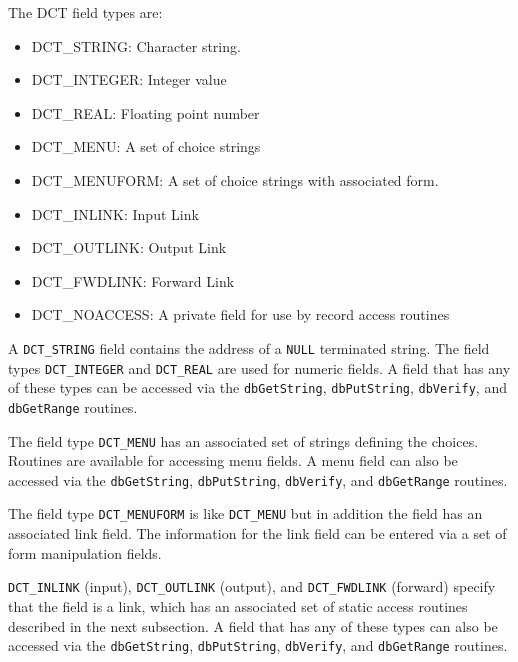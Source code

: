 The DCT field types are:

\begin{itemize}
\item {}DCT\_STRING: Character string.

\item {}DCT\_INTEGER: Integer value

\item {}DCT\_REAL: Floating point number

\item {}DCT\_MENU: A set of choice strings

\item {}DCT\_MENUFORM: A set of choice strings with associated form.

\item {}DCT\_INLINK: Input Link

\item {}DCT\_OUTLINK: Output Link

\item {}DCT\_FWDLINK: Forward Link

\item {}DCT\_NOACCESS: A private field for use by record access routines

\end{itemize}

A \verb|DCT_STRING| field contains the address of a \verb|NULL| terminated string. The field types \verb|DCT_INTEGER| and \verb|DCT_REAL| 
are used for numeric fields. A field that has any of these types can be accessed via the \verb|dbGetString|, \verb|dbPutString|, 
\verb|dbVerify|, and \verb|dbGetRange| routines.

The field type \verb|DCT_MENU| has an associated set of strings defining the choices. Routines are available for accessing menu 
fields. A menu field can also be accessed via the \verb|dbGetString|, \verb|dbPutString|, \verb|dbVerify|, and \verb|dbGetRange| 
routines.

The field type \verb|DCT_MENUFORM| is like \verb|DCT_MENU| but in addition the field has an associated link field. The information 
for the link field can be entered via a set of form manipulation fields.

\verb|DCT_INLINK| (input), \verb|DCT_OUTLINK| (output), and \verb|DCT_FWDLINK| (forward) specify that the field is a link, which has 
an associated set of static access routines described in the next subsection. A field that has any of these types can also be 
accessed via the \verb|dbGetString|, \verb|dbPutString|, \verb|dbVerify|, and \verb|dbGetRange| routines.

